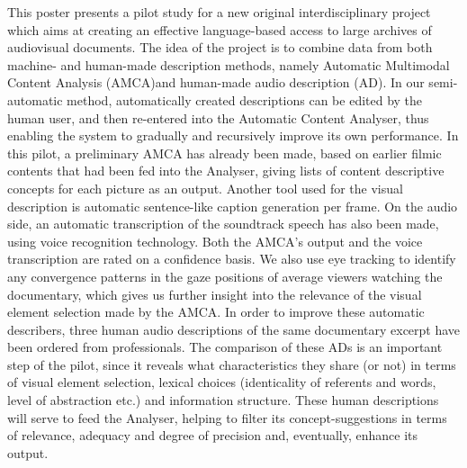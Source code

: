 This poster presents a pilot study for a new original interdisciplinary project which aims at creating an effective language-based access to large archives of audiovisual documents. The idea of the project is to combine data from both machine- and human-made description methods, namely Automatic Multimodal Content Analysis (AMCA)and human-made audio description (AD). In our semi-automatic method, automatically created descriptions can be edited by the human user, and then re-entered into the Automatic Content Analyser, thus enabling the system to gradually and recursively improve its own performance. In this pilot, a preliminary AMCA has already been made, based on earlier filmic contents that had been fed into the Analyser, giving lists of content descriptive concepts for each picture as an output. Another tool used for the visual description is automatic sentence-like caption generation per frame. On the audio side, an automatic transcription of the soundtrack speech has also been made, using voice recognition technology. Both the AMCA's output and the voice transcription are rated on a confidence basis. We also use eye tracking to identify any convergence patterns in the gaze positions of average viewers watching the documentary, which gives us further insight into the relevance of the visual element selection made by the AMCA. In order to improve these automatic describers, three human audio descriptions of the same documentary excerpt have been ordered from professionals. The comparison of these ADs is an important step of the pilot, since it reveals what characteristics they share (or not) in terms of visual element selection, lexical choices (identicality of referents and words, level of abstraction etc.) and information structure. These human descriptions will serve to feed the Analyser, helping to filter its concept-suggestions in terms of relevance, adequacy and degree of precision and, eventually, enhance its output.

